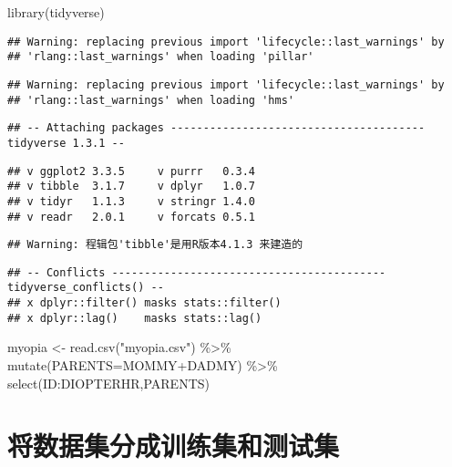 \documentclass[]{ctexbook}
\newenvironment{Shaded}{\begin{snugshade}}{\end{snugshade}}
\newcommand{\AttributeTok}[1]{\textcolor[rgb]{0.77,0.63,0.00}{#1}}
\newcommand{\FunctionTok}[1]{\textcolor[rgb]{0.00,0.00,0.00}{#1}}
\newcommand{\NormalTok}[1]{#1}
\newcommand{\OtherTok}[1]{\textcolor[rgb]{0.56,0.35,0.01}{#1}}
\newcommand{\SpecialCharTok}[1]{\textcolor[rgb]{0.00,0.00,0.00}{#1}}
\newcommand{\StringTok}[1]{\textcolor[rgb]{0.31,0.60,0.02}{#1}}
\begin{document}
\begin{Shaded}
\begin{Highlighting}[]
\FunctionTok{library}\NormalTok{(tidyverse)}
\end{Highlighting}
\end{Shaded}

\begin{verbatim}
## Warning: replacing previous import 'lifecycle::last_warnings' by
## 'rlang::last_warnings' when loading 'pillar'
\end{verbatim}

\begin{verbatim}
## Warning: replacing previous import 'lifecycle::last_warnings' by
## 'rlang::last_warnings' when loading 'hms'
\end{verbatim}

\begin{verbatim}
## -- Attaching packages --------------------------------------- tidyverse 1.3.1 --
\end{verbatim}

\begin{verbatim}
## v ggplot2 3.3.5     v purrr   0.3.4
## v tibble  3.1.7     v dplyr   1.0.7
## v tidyr   1.1.3     v stringr 1.4.0
## v readr   2.0.1     v forcats 0.5.1
\end{verbatim}

\begin{verbatim}
## Warning: 程辑包'tibble'是用R版本4.1.3 来建造的
\end{verbatim}

\begin{verbatim}
## -- Conflicts ------------------------------------------ tidyverse_conflicts() --
## x dplyr::filter() masks stats::filter()
## x dplyr::lag()    masks stats::lag()
\end{verbatim}

\begin{Shaded}
\begin{Highlighting}[]
\NormalTok{myopia }\OtherTok{\textless{}{-}} \FunctionTok{read.csv}\NormalTok{(}\StringTok{"myopia.csv"}\NormalTok{) }\SpecialCharTok{\%\textgreater{}\%} 
  \FunctionTok{mutate}\NormalTok{(}\AttributeTok{PARENTS=}\NormalTok{MOMMY}\SpecialCharTok{+}\NormalTok{DADMY) }\SpecialCharTok{\%\textgreater{}\%} 
  \FunctionTok{select}\NormalTok{(ID}\SpecialCharTok{:}\NormalTok{DIOPTERHR,PARENTS)}
\end{Highlighting}
\end{Shaded}

\hypertarget{ux5c06ux6570ux636eux96c6ux5206ux6210ux8badux7ec3ux96c6ux548cux6d4bux8bd5ux96c6}{%
\section{将数据集分成训练集和测试集}\label{ux5c06ux6570ux636eux96c6ux5206ux6210ux8badux7ec3ux96c6ux548cux6d4bux8bd5ux96c6}}
\end{document}
